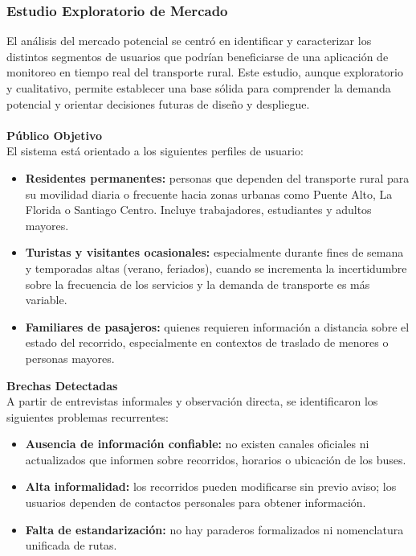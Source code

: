 \documentclass[12pt]{article}
\begin{document}
\subsubsection{Estudio Exploratorio de Mercado}
El análisis del mercado potencial se centró en identificar y caracterizar los distintos segmentos de usuarios que podrían beneficiarse de una aplicación de monitoreo en tiempo real del transporte rural. Este estudio, aunque exploratorio y cualitativo, permite establecer una base sólida para comprender la demanda potencial y orientar decisiones futuras de diseño y despliegue. 
\\\\
\textbf{Público Objetivo}
\\
El sistema está orientado a los siguientes perfiles de usuario:
\begin{itemize}
    \item \textbf{Residentes permanentes:} personas que dependen del transporte rural para su movilidad diaria o frecuente hacia zonas urbanas como Puente Alto, La Florida o Santiago Centro. Incluye trabajadores, estudiantes y adultos mayores. 

    \item \textbf{Turistas y visitantes ocasionales:} especialmente durante fines de semana y temporadas altas (verano, feriados), cuando se incrementa la incertidumbre sobre la frecuencia de los servicios y la demanda de transporte es más variable. 

    \item \textbf{Familiares de pasajeros:} quienes requieren información a distancia sobre el estado del recorrido, especialmente en contextos de traslado de menores o personas mayores. 
\end{itemize}
\textbf{Brechas Detectadas}
\\
A partir de entrevistas informales y observación directa, se identificaron los siguientes problemas recurrentes:
\begin{itemize}
    \item \textbf{Ausencia de información confiable:} no existen canales oficiales ni actualizados que informen sobre recorridos, horarios o ubicación de los buses. 

    \item \textbf{Alta informalidad:} los recorridos pueden modificarse sin previo aviso; los usuarios dependen de contactos personales para obtener información. 

    \item \textbf{Falta de estandarización:} no hay paraderos formalizados ni nomenclatura unificada de rutas. 
\end{itemize}
\end{document}
